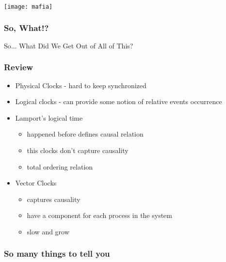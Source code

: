 \documentclass[aspectratio=169, 15pt,usenames,dvipsnames]{beamer}
\begin{document}
{	\begin{gdblank}		
		\centering
		\texttt{[image: mafia]}
	\end{gdblank}
	\begin{gdblank}
		\frametitle{So, What!?}
		\centering
		\large 
		So... What Did We Get Out of All of This?
	\end{gdblank}	
	\begin{gdblank}
		\frametitle{Review}
		\begin{itemize}
			\large
			\item Physical Clocks - hard to keep synchronized
			\item Logical clocks - can provide some notion of relative events occurrence
			\item Lamport's logical time
			      \begin{itemize}
			      	\item happened before defines causal relation
			      	\item this clocks don't capture causality
			      	\item total ordering relation
			      \end{itemize}
			\item Vector Clocks
			      \begin{itemize}
			      	\item captures causality
			      	\item have a component for each process in the system
			      	\item slow and grow
			      \end{itemize}
		\end{itemize}
	\end{gdblank} 
	\begin{gdblank}
		\frametitle{So many things to tell you}
		\begin{itemize}

\end{itemize}
\end{gdblank}}
\end{document}

